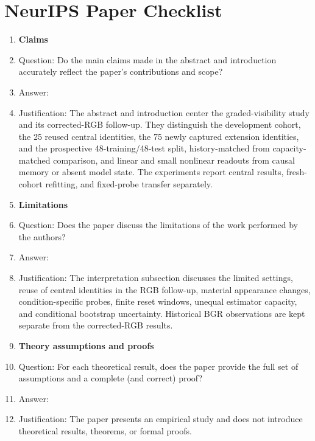 \section*{NeurIPS Paper Checklist}

\begin{enumerate}

\item {\bf Claims}
    \item[] Question: Do the main claims made in the abstract and introduction accurately reflect the paper's contributions and scope?
    \item[] Answer: \answerYes{}
    \item[] Justification: The abstract and introduction center the graded-visibility study and its corrected-RGB follow-up. They distinguish the development cohort, the 25 reused central identities, the 75 newly captured extension identities, and the prospective 48-training/48-test split, history-matched from capacity-matched comparison, and linear and small nonlinear readouts from causal memory or absent model state. The experiments report central results, fresh-cohort refitting, and fixed-probe transfer separately.


\item {\bf Limitations}
    \item[] Question: Does the paper discuss the limitations of the work performed by the authors?
    \item[] Answer: \answerYes{}
    \item[] Justification: The interpretation subsection discusses the limited settings, reuse of central identities in the RGB follow-up, material appearance changes, condition-specific probes, finite reset windows, unequal estimator capacity, and conditional bootstrap uncertainty. Historical BGR observations are kept separate from the corrected-RGB results.


\item {\bf Theory assumptions and proofs}
    \item[] Question: For each theoretical result, does the paper provide the full set of assumptions and a complete (and correct) proof?
    \item[] Answer: \answerNA{}
    \item[] Justification: The paper presents an empirical study and does not introduce theoretical results, theorems, or formal proofs.



\end{enumerate}

